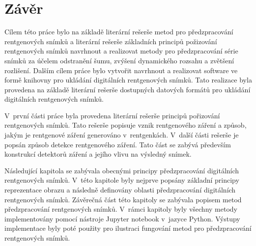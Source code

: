 \chapter{Závěr}

Cílem této práce bylo na základě literární rešerše metod pro předzpracování rentgenových snímků a literární rešerše základních principů požizování rentgenových snímků navrhnout a realizovat metody pro předzpracování série snímků za účelem odstranění šumu, zvýšení dynamického rozsahu a zvětšení rozlišení. Dalším cílem práce bylo vytvořit navrhnout a realizovat software ve formě knihovny pro ukládání digitálních rentgenových snímků. Tato realizace byla provedena na základě literární rešerše dostupných datových formátů pro ukládání digitálních rentgenových snímků. 

V~první části práce byla provedena literární rešerše principů pořizování rentgenových snímků. Tato rešerše popisuje vznik rentgenového záření a způsob, jakým je rentgenové záření generováno v~rentgenkách. V~další části rešerše je popsán způsob detekce rentgenového záření. Tato část se zabývá především konstrukcí detektorů záření a jejího vlivu na výsledný snímek.

Následující kapitola se zabývala obecnými principy předzpracování digitálních rentgenových snímků. V~této kapitole byly nejprve popsány základní principy reprezentace obrazu a následně definovány oblasti předzpracování digitálních rentgenových snímků. Závěrečná část této kapitoly se zabývala popisem metod předzpracování rentgenových snímků. V~rámci kapitoly byly všechny metody implementovány pomocí nástroje Jupyter notebook v~jazyce Python. Výstupy implementace byly poté použity pro ilustraci fungování metod pro předzpracování rentgenových snímků.